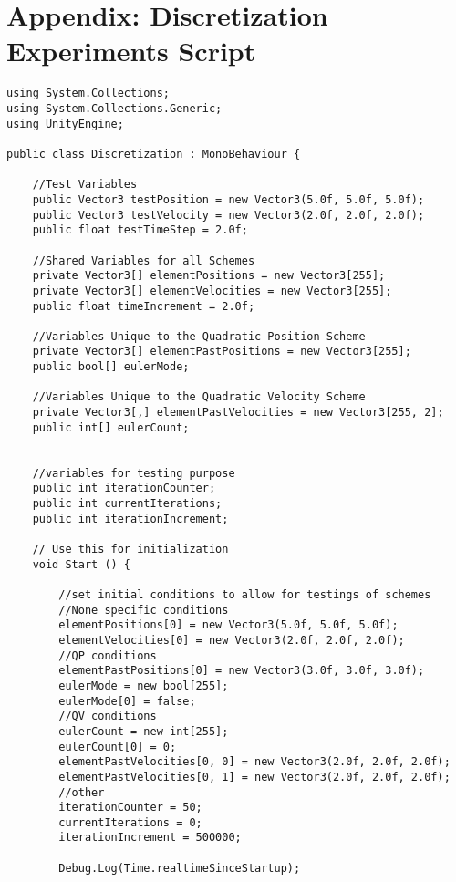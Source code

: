 \section{Appendix: Discretization Experiments Script}

\begin{mdframed}[linecolor=black, topline=true, bottomline=true,
  leftline=false, rightline=false]
\begin{verbatim}
using System.Collections;
using System.Collections.Generic;
using UnityEngine;

public class Discretization : MonoBehaviour {

    //Test Variables
    public Vector3 testPosition = new Vector3(5.0f, 5.0f, 5.0f);
    public Vector3 testVelocity = new Vector3(2.0f, 2.0f, 2.0f);
    public float testTimeStep = 2.0f;

    //Shared Variables for all Schemes
    private Vector3[] elementPositions = new Vector3[255];
    private Vector3[] elementVelocities = new Vector3[255];
    public float timeIncrement = 2.0f;

    //Variables Unique to the Quadratic Position Scheme
    private Vector3[] elementPastPositions = new Vector3[255];
    public bool[] eulerMode;

    //Variables Unique to the Quadratic Velocity Scheme 
    private Vector3[,] elementPastVelocities = new Vector3[255, 2];
    public int[] eulerCount;


    //variables for testing purpose
    public int iterationCounter;
    public int currentIterations;
    public int iterationIncrement;

    // Use this for initialization
    void Start () {

        //set initial conditions to allow for testings of schemes
        //None specific conditions
        elementPositions[0] = new Vector3(5.0f, 5.0f, 5.0f);
        elementVelocities[0] = new Vector3(2.0f, 2.0f, 2.0f);
        //QP conditions
        elementPastPositions[0] = new Vector3(3.0f, 3.0f, 3.0f);
        eulerMode = new bool[255];
        eulerMode[0] = false;
        //QV conditions
        eulerCount = new int[255];
        eulerCount[0] = 0;
        elementPastVelocities[0, 0] = new Vector3(2.0f, 2.0f, 2.0f);
        elementPastVelocities[0, 1] = new Vector3(2.0f, 2.0f, 2.0f);
        //other
        iterationCounter = 50;
        currentIterations = 0;
        iterationIncrement = 500000;

        Debug.Log(Time.realtimeSinceStartup);        


\end{verbatim}
\end{mdframed}
